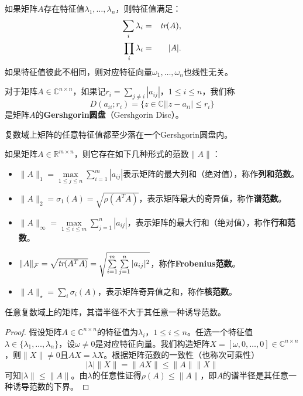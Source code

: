 \begin{proposition}
如果矩阵$A$存在特征值$\lambda_1,\ldots,\lambda_n$，则特征值满足：
\begin{eqnarray}
  \sum\limits_i \lambda_i &=& \operatorname{\textit{tr}}(A), \\
  \prod\limits_i \lambda_i &=& |A|.
\end{eqnarray}
如果特征值彼此不相同，则对应特征向量$\omega_1,\ldots, \omega_n$也线性无关。
\end{proposition}

\begin{definition}[Gershgorin圆盘]
对于矩阵$A\in \mathbb C^{n\times n}$，如果记$r_i=\sum\limits_{j\ne i} |a_{ij}|$，$1\le i\le n$，我们称
\begin{equation}
    D(a_{ii}; r_i) = \bigg\{z\in \mathbb C \bigg| |z - a_{ii}| \le r_i\bigg\}
\end{equation}
是矩阵$A$的\textbf{Gershgorin圆盘}（Gershgorin Disc）。
\end{definition}

\begin{theorem}[Gershgorin圆盘定理]
复数域上矩阵的任意特征值都至少落在一个Gershgorin圆盘内。
\end{theorem}

\begin{definition}[矩阵范数]
如果矩阵$A\in \mathbb R^{m\times n}$，则它存在如下几种形式的范数$\|A\|$：
\begin{itemize}
  \item $\|A\|_1=\max\limits_{1\le j\le n} \sum\limits_{i=1}^m |a_{ij}|$表示矩阵的最大列和（绝对值），称作\textbf{列和范数}。
  \item $\|A\|_2=\sigma_1(A)=\sqrt{\rho(A^T A)}$，表示矩阵最大的奇异值，称作\textbf{谱范数}。
  \item $\|A\|_{\infty}=\max\limits_{1\le i\le m} \sum\limits_{j=1}^n |a_{ij}|$，表示矩阵的最大行和（绝对值），称作\textbf{行和范数}。
  \item $\|A\|_{\mathcal F}=\sqrt{\operatorname{\textit{tr}}(A^T A)}=\sqrt{\sum\limits_{i=1}^m \sum\limits_{j=1}^n |a_{ij}|^2}$，称作\textbf{Frobenius范数}。
  \item $\|A\|_{\star}=\sum\limits_i \sigma_i(A)$，表示矩阵奇异值之和，称作\textbf{核范数}。
\end{itemize}
\end{definition}

\begin{theorem}\label{th:spectral-radius-norm}
任意复数域上的矩阵，其谱半径不大于其任意一种诱导范数。

\begin{proof}
假设矩阵$A\in \mathbb C^{n\times n}$的特征值为$\lambda_i$，$1\le i \le n$。任选一个特征值$\lambda\in\{\lambda_1,\ldots,\lambda_n\}$，设$\omega\ne 0$是对应特征向量。我们构造矩阵$X=[\omega,0,\ldots,0]\in \mathbb C^{n\times n}$，则$\|X\|\ne 0$且$AX=\lambda X$。根据矩阵范数的一致性（也称次可乘性）
\[
    |\lambda|\|X\|=\|AX\| \le \|A\|\|X\|
\]
可知$|\lambda\|\le \|A\|$。由$\lambda$的任意性证得$\rho(A)\le \|A\|$，即$A$的谱半径是其任意一种诱导范数的下界。
\end{proof}
\end{theorem}

